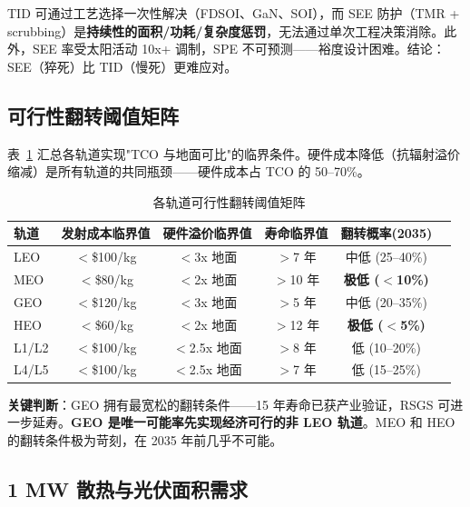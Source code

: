 \begin{observation}
TID 可通过工艺选择一次性解决（FDSOI、GaN、SOI），而 SEE 防护（TMR + scrubbing）是\textbf{持续性的面积/功耗/复杂度惩罚}，无法通过单次工程决策消除。此外，SEE 率受太阳活动 10x+ 调制，SPE 不可预测——裕度设计困难。结论：SEE（猝死）比 TID（慢死）更难应对。
\end{observation}

\subsection{可行性翻转阈值矩阵}

表~\ref{tab:flip-threshold} 汇总各轨道实现"TCO 与地面可比"的临界条件。硬件成本降低（抗辐射溢价缩减）是所有轨道的共同瓶颈——硬件成本占 TCO 的 50--70\%。

\begin{table}[H]
\centering
\caption{各轨道可行性翻转阈值矩阵}
\label{tab:flip-threshold}
\small
\begin{tabular}{@{}lccccc@{}}
\toprule
\textbf{轨道} & \textbf{发射成本临界值} & \textbf{硬件溢价临界值} & \textbf{寿命临界值} & \textbf{翻转概率(2035)} \\
\midrule
LEO    & $<$\$100/kg & $<$3x 地面 & $>$7 年  & 中低 (25--40\%) \\
MEO    & $<$\$80/kg  & $<$2x 地面 & $>$10 年 & \textbf{极低 ($<$10\%)} \\
GEO    & $<$\$120/kg & $<$3x 地面 & $>$5 年  & 中低 (20--35\%) \\
HEO    & $<$\$60/kg  & $<$2x 地面 & $>$12 年 & \textbf{极低 ($<$5\%)}  \\
L1/L2  & $<$\$100/kg & $<$2.5x 地面 & $>$8 年  & 低 (10--20\%) \\
L4/L5  & $<$\$100/kg & $<$2.5x 地面 & $>$7 年  & 低 (15--25\%) \\
\bottomrule
\end{tabular}
\end{table}

\textbf{关键判断}：GEO 拥有最宽松的翻转条件——15 年寿命已获产业验证，RSGS 可进一步延寿。\textbf{GEO 是唯一可能率先实现经济可行的非 LEO 轨道}。MEO 和 HEO 的翻转条件极为苛刻，在 2035 年前几乎不可能。

\subsection{1 MW 散热与光伏面积需求}

